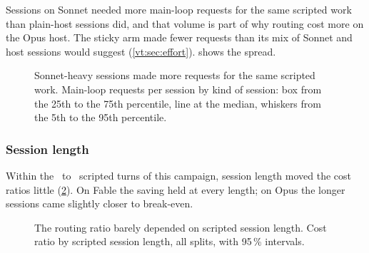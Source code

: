 Sessions on Sonnet needed more main-loop requests for the same scripted work than plain-host sessions did, and
that volume is part of why routing cost more on the Opus host. The sticky arm made fewer requests than its mix of
Sonnet and host sessions would suggest (\cref{vt:sec:effort}).  shows the spread.

\begin{figure}[tbp]
\centering

\caption{Sonnet-heavy sessions made more requests for the same scripted work. Main-loop requests per session by kind of session: box from the 25th to the 75th percentile, line at
the median, whiskers from the 5th to the 95th percentile.}
\label{vt:fig:requests}
\end{figure}


\subsubsection{Session length}

Within the \MinTurns\ to \MaxTurns\ scripted turns of this campaign, session length moved the cost ratios little (\cref{vt:fig:band}).
On Fable the saving held at every length; on Opus the longer sessions came slightly closer to break-even.

\begin{figure}[tbp]
\centering
{}\par\smallskip

\caption{The routing ratio barely depended on scripted session length. Cost ratio by scripted session length, all splits, with 95\,\% intervals.}
\label{vt:fig:band}
\end{figure}


